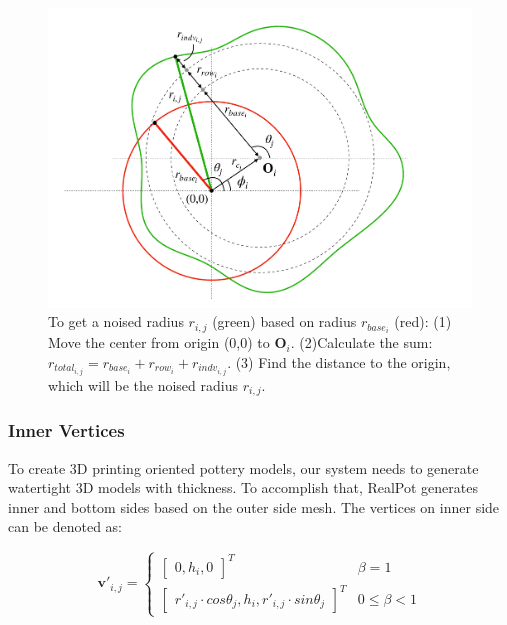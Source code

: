 \documentclass{svjour3}                     %
\begin{document}
\begin{figure}
\includegraphics[width=\textwidth]{fig5.pdf}
\caption{To get a noised radius $r_{i,j}$ (green) based on radius $r_{base_{i}}$ (red): (1) Move the center from origin (0,0) to $\mathbf{O}_{i}$. (2)Calculate the sum: $r_{total_{i,j}} = r_{base_{i}} + r_{row_{i}} + r_{indv_{i,j}}$. (3) Find the distance to the origin, which will be the noised radius $r_{i,j}$.}
\label{fig:noise}
\end{figure}

\subsubsection{Inner Vertices}

To create 3D printing oriented pottery models, our system needs to generate watertight 3D models with thickness.
To accomplish that, RealPot generates inner and bottom sides based on the outer side mesh. The vertices on inner side can be denoted as:

\begin{equation}
\label{eqn:v'}
\mathbf{v'}_{i,j} 
= \begin{cases}
\begin{bmatrix}
0,h_{i},0
\end{bmatrix}^T & \beta=1
\\
\begin{bmatrix}
r'_{i,j} \cdot cos \theta_{j},
h_{i},
r'_{i,j} \cdot sin \theta_{j}
\end{bmatrix}^T & 0 \le \beta<1
\end{cases}
\end{equation}
\end{document}

